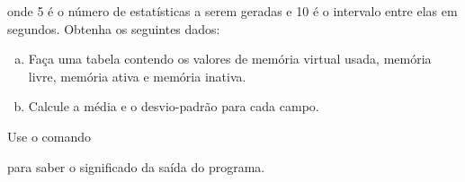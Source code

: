 \bigskip


\noindent onde 5 é o número de estatísticas a serem geradas e 10 é o
intervalo entre elas em segundos. Obtenha os seguintes dados:

\begin{enumerate}[a)]
\item  Faça uma tabela contendo os valores
  de memória virtual usada, memória livre, memória ativa e memória
  inativa. 
\item Calcule a média e o desvio-padrão para cada campo.
\end{enumerate}

\noindent Use o comando

\bigskip


\noindent para saber o significado da saída do programa.

